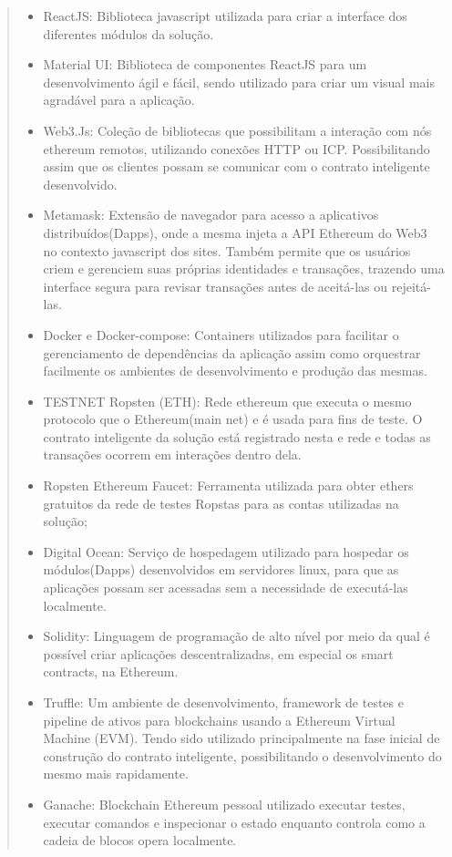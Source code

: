     \begin{quote}
    \begin{itemize}
        \item ReactJS: Biblioteca javascript utilizada para criar a interface dos diferentes módulos da solução.
        \item Material UI: Biblioteca de componentes ReactJS para um desenvolvimento ágil e fácil, sendo utilizado para criar um visual mais agradável para a aplicação.
        \item Web3.Js: Coleção de bibliotecas que possibilitam a interação com nós ethereum remotos, utilizando conexões HTTP ou ICP. Possibilitando assim que os clientes possam se comunicar com o contrato inteligente desenvolvido.
        \item Metamask: Extensão de navegador para acesso a aplicativos distribuídos(Dapps), onde a mesma injeta a API Ethereum do Web3 no contexto javascript dos sites. Também permite que os usuários criem e gerenciem suas próprias identidades e transações, trazendo uma interface segura para revisar transações antes de aceitá-las ou rejeitá-las.
        \item Docker e Docker-compose: Containers utilizados para facilitar o gerenciamento de dependências da aplicação assim como orquestrar facilmente os ambientes de desenvolvimento e produção das mesmas.
        \item TESTNET Ropsten (ETH): Rede ethereum que executa o mesmo protocolo que o Ethereum(main net) e é usada para fins de teste. O contrato inteligente da solução está registrado nesta e rede e todas as transações ocorrem em interações dentro dela.
        \item Ropsten Ethereum Faucet: Ferramenta utilizada para obter ethers gratuitos da rede de testes Ropstas para as contas utilizadas na solução;
        \item Digital Ocean: Serviço de hospedagem utilizado para hospedar os módulos(Dapps) desenvolvidos em servidores linux, para que as aplicações possam ser acessadas sem a necessidade de executá-las localmente.
        \item Solidity: Linguagem de programação de alto nível por meio da qual é possível criar aplicações descentralizadas, em especial os smart contracts, na Ethereum. 
        \item Truffle: Um ambiente de desenvolvimento, framework de testes e pipeline de ativos para blockchains usando a Ethereum Virtual Machine (EVM). Tendo sido utilizado principalmente na fase inicial de construção do contrato inteligente, possibilitando o desenvolvimento do mesmo mais rapidamente.
        \item Ganache: Blockchain Ethereum pessoal utilizado executar testes, executar comandos e inspecionar o estado enquanto controla como a cadeia de blocos opera localmente.
    \end{itemize}
    \end{quote}
        
